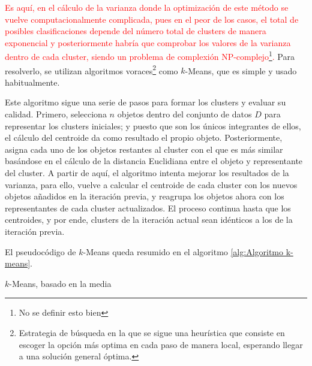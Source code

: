 \documentclass[3p,twocolumn]{elsarticle}
\begin{document}
\textcolor{Red}{Es aquí, en el cálculo de la varianza donde la optimización de este método se vuelve computacionalmente complicada, pues en el peor de los casos, el total de posibles clasificaciones depende del número total de clusters de manera exponencial y posteriormente habría que comprobar los valores de la varianza dentro de cada cluster, siendo un problema de complexión NP-complejo\footnote{No se definir esto bien}.} Para resolverlo, se utilizan algoritmos voraces\footnote{Estrategia de búsqueda en la que se sigue una heurística que consiste en escoger la opción más optima en cada paso de manera local, esperando llegar a una solución general óptima.} como $k$-Means, que es simple y usado habitualmente.

Este algoritmo sigue una serie de pasos para formar los clusters y evaluar su calidad. Primero, selecciona $n$ objetos dentro del conjunto de datos $D$ para representar los clusters iniciales; y puesto que son los únicos integrantes de ellos, el cálculo del centroide da como resultado el propio objeto. Posteriormente, asigna cada uno de los objetos restantes al cluster con el que es más similar basándose en el cálculo de la distancia Euclidiana entre el objeto y representante del cluster. A partir de aquí, el algoritmo intenta mejorar los resultados de la varianza, para ello, vuelve a calcular el centroide de cada cluster con los nuevos objetos añadidos en la iteración previa, y reagrupa los objetos ahora con los representantes de cada cluster actualizados. El proceso continua hasta que los centroides, y por ende, clusters de la iteración actual sean idénticos a los de la iteración previa.

El pseudocódigo de $k$-Means queda resumido en el algoritmo \ref{alg:Algoritmo k-means}. 

\begin{algorithm}[ht]
\SetAlgoLined
  \LinesNumbered
  \DontPrintSemicolon
  \caption{$k$-Means, basado en la media}
  \label{alg:Algoritmo k-means}
\end{algorithm}
\end{document}
